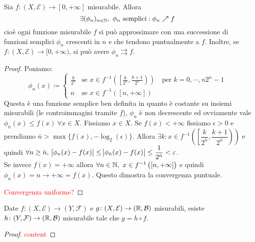 \begin{proposition}
	Sia $ f\colon (X,\mathcal{E}) \to [0, +\infty] $ misurabile. Allora
	\[ \exists (\phi_n)_{n\in\mathbb{N}},\ \phi_n \text{ semplici} : \phi_n \nearrow f \]
	cioè ogni funzione misurabile $ f $ si può approssimare con una successione di funzioni semplici $ \phi_n $ crescenti in $ n $ e che tendono puntualmente a $ f $.
	Inoltre, se $ f\colon (X,\mathcal{E}) \to [0,+\infty) $, si può avere $ \phi_n \rightrightarrows f $.
\end{proposition}
\begin{proof}
	Poniamo:
	\[ \phi_n (x) \coloneqq
    \begin{cases}
			\frac{k}{2^n} & \text{se } x \in f^{-1}\left( \left[\frac{k}{2^n}, \frac{k+1}{2^n} \right)  \right) \quad\text{per } k=0,\cdots,n2^n-1\\
			n             & \text{se } x \in f^{-1}\left( [n, +\infty] \right)
		\end{cases}
	 \]
	Questa è una funzione semplice ben definita in quanto è costante su insiemi misurabili (le controimmagini tramite $ f $), $ \phi_n $ è non decrescente ed ovviamente vale $ \phi_n(x) \leq f(x)\ \forall x\in X $.
	Fissiamo $ x\in X $. Se $ f(x)<+\infty $ fissiamo $ \epsilon > 0 $ e prendiamo $ \bar n > \max\{ f(x), -\log_2(\epsilon) \} $. Allora $ \exists k : x\in f^{-1}\left( \left[\dfrac{k}{2^{\bar n} }, \dfrac{k+1}{2^{\bar n} } \right) \right) $ e quindi $ \forall n\ge \bar{n}, \ \abs{\phi_n(x) - f(x)} \leq \abs{\phi_{\bar{n}}(x) - f(x)} \leq \dfrac{1}{2^{\bar n}} < \epsilon $. \\
	Se invece $ f(x) = +\infty $ allora $ \forall n \in \mathbb{N}, \ x\in f^{-1}\left( [n, +\infty] \right) $ e quindi $ \phi_n(x) = n \to +\infty = f(x) $. Questo dimostra la convergenza puntuale.

	\textcolor{red}{Convergenza uniforme?}
\end{proof}
\begin{proposition}
	Date $ f \colon (X, \mathcal{E}) \to (Y, \mathcal{F}) $ e $ g \colon (X, \mathcal{E}) \to (\mathbb{R}, \mathcal{B}) $ misurabili, esiste $ h \colon (Y, \mathcal{F}) \to (\mathbb{R}, \mathcal{B}) $ misurabile tale che $ g=h\circ f $. 
	\begin{center}
	\end{center}
\end{proposition}
\begin{proof}
	\textcolor{red}{content}
\end{proof}

